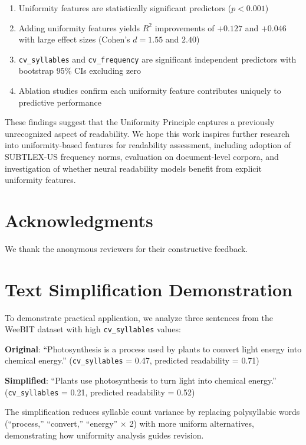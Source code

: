 \documentclass[11pt,letterpaper]{article}
\begin{document}
\begin{enumerate}
  \item Uniformity features are statistically significant predictors ($p < 0.001$)
  \item Adding uniformity features yields $R^2$ improvements of $+0.127$ and $+0.046$ with large effect sizes (Cohen's $d = 1.55$ and $2.40$)
  \item \texttt{cv\_syllables} and \texttt{cv\_frequency} are significant independent predictors with bootstrap 95\% CIs excluding zero
  \item Ablation studies confirm each uniformity feature contributes uniquely to predictive performance
\end{enumerate}

These findings suggest that the Uniformity Principle captures a previously unrecognized aspect of readability. We hope this work inspires further research into uniformity-based features for readability assessment, including adoption of SUBTLEX-US frequency norms, evaluation on document-level corpora, and investigation of whether neural readability models benefit from explicit uniformity features.

\section*{Acknowledgments}

We thank the anonymous reviewers for their constructive feedback.




\appendix

\section{Text Simplification Demonstration}
\label{app:simplification}

To demonstrate practical application, we analyze three sentences from the WeeBIT dataset with high \texttt{cv\_syllables} values:

\textbf{Original}: ``Photosynthesis is a process used by plants to convert light energy into chemical energy.'' (\texttt{cv\_syllables} = 0.47, predicted readability = 0.71)

\textbf{Simplified}: ``Plants use photosynthesis to turn light into chemical energy.'' (\texttt{cv\_syllables} = 0.21, predicted readability = 0.52)

The simplification reduces syllable count variance by replacing polysyllabic words (``process,'' ``convert,'' ``energy'' $\times$ 2) with more uniform alternatives, demonstrating how uniformity analysis guides revision.
\end{document}
